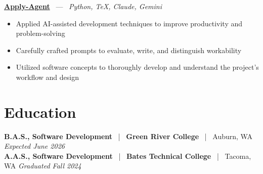 \documentclass[10pt, letterpaper]{article}
\newcommand{\jobhead}[4]{%
  \vspace{5pt}%
  {\bfseries\color{dark}#1}%
  ~{\color{light}|}~%
  {\bfseries\color{navy}#2}%
  ~{\color{light}|}~%
  {\color{light}#3}%
  \hfill{\color{light}\small\textit{#4}}\\[-2pt]%
}
\newcommand{\projhead}[3]{%
  \vspace{5pt}%
  {\bfseries\color{dark}\href{#2}{#1}}%
  ~{\color{light}---}~%
  {\color{light}\small\textit{#3}}\\[-2pt]%
}
\begin{document}
\projhead{Apply-Agent}{https://github.com/timmyd4/apply-agent}{Python, TeX, Claude, Gemini}
\begin{itemize}
  \item Applied AI-assisted development techniques to improve productivity and problem-solving
  \item Carefully crafted prompts to evaluate, write, and distinguish workability
  \item Utilized software concepts to thoroughly develop and understand the project's workflow and design
\end{itemize}

\section{Education}

\jobhead{B.A.S., Software Development}{Green River College}{Auburn, WA}{Expected June 2026}
\jobhead{A.A.S., Software Development}{Bates Technical College}{Tacoma, WA}{Graduated Fall 2024}
\end{document}
